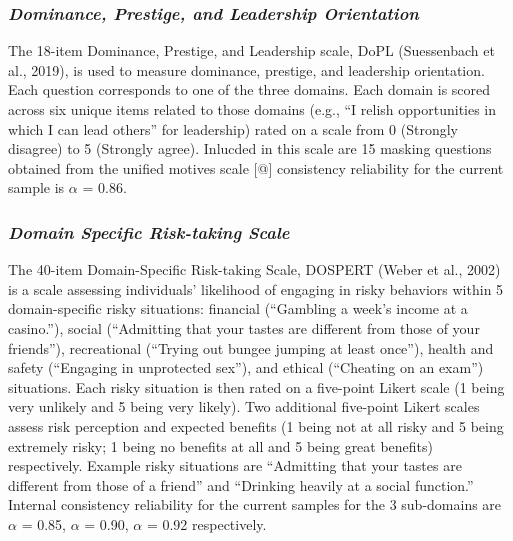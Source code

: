 \documentclass[
  donotrepeattitle,doc, 12pt, a4paper,floatsintext]{apa7}
\begin{document}
\hypertarget{dominance-prestige-and-leadership-orientation-2}{%
\subsubsection{\texorpdfstring{\emph{Dominance, Prestige, and Leadership Orientation}}{Dominance, Prestige, and Leadership Orientation}}\label{dominance-prestige-and-leadership-orientation-2}}

The 18-item Dominance, Prestige, and Leadership scale, DoPL (Suessenbach et al., 2019), is used to measure dominance, prestige, and leadership orientation. Each question corresponds to one of the three domains. Each domain is scored across six unique items related to those domains (e.g., ``I relish opportunities in which I can lead others'' for leadership) rated on a scale from 0 (Strongly disagree) to 5 (Strongly agree). Inlucded in this scale are 15 masking questions obtained from the unified motives scale {[}@{]} consistency reliability for the current sample is \(\alpha\) = 0.86.

\hypertarget{domain-specific-risk-taking-scale}{%
\subsubsection{\texorpdfstring{\emph{Domain Specific Risk-taking Scale}}{Domain Specific Risk-taking Scale}}\label{domain-specific-risk-taking-scale}}

The 40-item Domain-Specific Risk-taking Scale, DOSPERT (Weber et al., 2002) is a scale assessing individuals' likelihood of engaging in risky behaviors within 5 domain-specific risky situations: financial (``Gambling a week's income at a casino.''), social (``Admitting that your tastes are different from those of your friends''), recreational (``Trying out bungee jumping at least once''), health and safety (``Engaging in unprotected sex''), and ethical (``Cheating on an exam'') situations. Each risky situation is then rated on a five-point Likert scale (1 being very unlikely and 5 being very likely). Two additional five-point Likert scales assess risk perception and expected benefits (1 being not at all risky and 5 being extremely risky; 1 being no benefits at all and 5 being great benefits) respectively. Example risky situations are ``Admitting that your tastes are different from those of a friend'' and ``Drinking heavily at a social function.'' Internal consistency reliability for the current samples for the 3 sub-domains are \(\alpha\) = 0.85, \(\alpha\) = 0.90, \(\alpha\) = 0.92 respectively.
\end{document}
